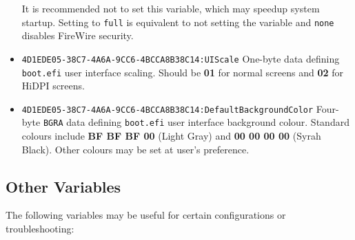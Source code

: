 \documentclass[]{article}
\begin{document}
\begin{itemize}
  It is recommended not to set this variable, which may speedup system startup. Setting to
  \texttt{full} is equivalent to not setting the variable and \texttt{none} disables
  FireWire security.
 \item
  \texttt{4D1EDE05-38C7-4A6A-9CC6-4BCCA8B38C14:UIScale}
  \break
  One-byte data defining \texttt{boot.efi} user interface scaling. Should be \textbf{01} for normal
  screens and \textbf{02} for HiDPI screens.
 \item
  \texttt{4D1EDE05-38C7-4A6A-9CC6-4BCCA8B38C14:DefaultBackgroundColor}
  \break
  Four-byte \texttt{BGRA} data defining \texttt{boot.efi} user interface background colour.
  Standard colours include \textbf{BF BF BF 00} (Light Gray) and \textbf{00 00 00 00}
  (Syrah Black). Other colours may be set at user's preference.
\end{itemize}

\subsection{Other Variables}\label{nvramvarsother}

The following variables may be useful for certain configurations or
troubleshooting:
\end{document}
